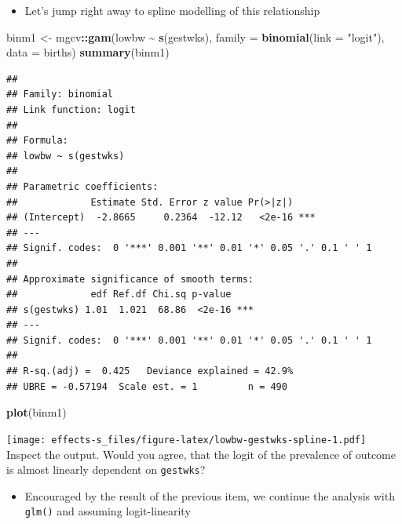 \documentclass[
]{book}
\newenvironment{Shaded}{\begin{snugshade}}{\end{snugshade}}
\newcommand{\AttributeTok}[1]{\textcolor[rgb]{0.13,0.29,0.53}{#1}}
\newcommand{\FunctionTok}[1]{\textcolor[rgb]{0.13,0.29,0.53}{\textbf{#1}}}
\newcommand{\NormalTok}[1]{#1}
\newcommand{\OtherTok}[1]{\textcolor[rgb]{0.56,0.35,0.01}{#1}}
\newcommand{\SpecialCharTok}[1]{\textcolor[rgb]{0.81,0.36,0.00}{\textbf{#1}}}
\newcommand{\StringTok}[1]{\textcolor[rgb]{0.31,0.60,0.02}{#1}}
\providecommand{\tightlist}{%
  \setlength{\itemsep}{0pt}\setlength{\parskip}{0pt}}
\begin{document}
\begin{itemize}
\tightlist
\item
  Let's jump right away to spline modelling of this relationship
\end{itemize}

\begin{Shaded}
\begin{Highlighting}[]
\NormalTok{binm1 }\OtherTok{\textless{}{-}}\NormalTok{ mgcv}\SpecialCharTok{::}\FunctionTok{gam}\NormalTok{(lowbw }\SpecialCharTok{\textasciitilde{}} \FunctionTok{s}\NormalTok{(gestwks), }\AttributeTok{family =} \FunctionTok{binomial}\NormalTok{(}\AttributeTok{link =} \StringTok{"logit"}\NormalTok{), }\AttributeTok{data =}\NormalTok{ births)}
\FunctionTok{summary}\NormalTok{(binm1)}
\end{Highlighting}
\end{Shaded}

\begin{verbatim}
## 
## Family: binomial 
## Link function: logit 
## 
## Formula:
## lowbw ~ s(gestwks)
## 
## Parametric coefficients:
##             Estimate Std. Error z value Pr(>|z|)    
## (Intercept)  -2.8665     0.2364  -12.12   <2e-16 ***
## ---
## Signif. codes:  0 '***' 0.001 '**' 0.01 '*' 0.05 '.' 0.1 ' ' 1
## 
## Approximate significance of smooth terms:
##             edf Ref.df Chi.sq p-value    
## s(gestwks) 1.01  1.021  68.86  <2e-16 ***
## ---
## Signif. codes:  0 '***' 0.001 '**' 0.01 '*' 0.05 '.' 0.1 ' ' 1
## 
## R-sq.(adj) =  0.425   Deviance explained = 42.9%
## UBRE = -0.57194  Scale est. = 1         n = 490
\end{verbatim}

\begin{Shaded}
\begin{Highlighting}[]
\FunctionTok{plot}\NormalTok{(binm1)}
\end{Highlighting}
\end{Shaded}

\texttt{[image: effects-s\_files/figure-latex/lowbw-gestwks-spline-1.pdf]}
Inspect the output. Would you agree, that the logit of the prevalence
of outcome is almost linearly dependent on \texttt{gestwks}?

\begin{itemize}
\tightlist
\item
  Encouraged by the result of the previous item, we continue the analysis
  with \texttt{glm()} and assuming logit-linearity
\end{itemize}
\end{document}
